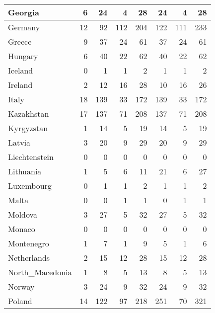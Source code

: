\begin{table}
\begin{center}
\begin{tabular}{|l|r|r|r|r||r|r|r|}
                       Georgia&     6&    24&     4&    28&    24&     4&    28 \\\hline
                       Germany&    12&    92&   112&   204&   122&   111&   233 \\\hline
                        Greece&     9&    37&    24&    61&    37&    24&    61 \\\hline
                       Hungary&     6&    40&    22&    62&    40&    22&    62 \\\hline
                       Iceland&     0&     1&     1&     2&     1&     1&     2 \\\hline
                       Ireland&     2&    12&    16&    28&    10&    16&    26 \\\hline
                         Italy&    18&   139&    33&   172&   139&    33&   172 \\\hline
                    Kazakhstan&    17&   137&    71&   208&   137&    71&   208 \\\hline
                    Kyrgyzstan&     1&    14&     5&    19&    14&     5&    19 \\\hline
                        Latvia&     3&    20&     9&    29&    20&     9&    29 \\\hline
                 Liechtenstein&     0&     0&     0&     0&     0&     0&     0 \\\hline
                     Lithuania&     1&     5&     6&    11&    21&     6&    27 \\\hline
                    Luxembourg&     0&     1&     1&     2&     1&     1&     2 \\\hline
                         Malta&     0&     0&     1&     1&     0&     1&     1 \\\hline
                       Moldova&     3&    27&     5&    32&    27&     5&    32 \\\hline
                        Monaco&     0&     0&     0&     0&     0&     0&     0 \\\hline
                    Montenegro&     1&     7&     1&     9&     5&     1&     6 \\\hline
                   Netherlands&     2&    15&    12&    28&    15&    12&    28 \\\hline
               North_Macedonia&     1&     8&     5&    13&     8&     5&    13 \\\hline
                        Norway&     3&    24&     9&    32&    24&     9&    32 \\\hline
                        Poland&    14&   122&    97&   218&   251&    70&   321 \\\hline

\end{tabular}
\end{center}
\end{table}
